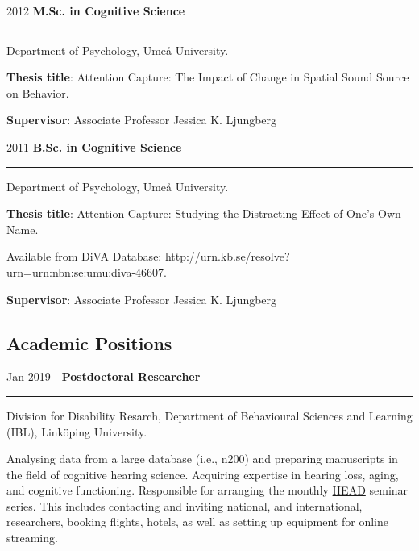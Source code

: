 \documentclass[]{article}
\begin{document}
2012 \hspace{1.5cm}\textbf{M.Sc. in Cognitive Science}\vspace{1mm}

\hrule
\begin{changemargin}{2.3cm}{2.4cm}

Department of Psychology, Umeå University.

\textbf{Thesis title}: Attention Capture: The Impact of Change in Spatial Sound Source on Behavior. 
    
\textbf{Supervisor}: Associate Professor Jessica K. Ljungberg
\end{changemargin}

2011 \hspace{1.5cm}\textbf{B.Sc. in Cognitive Science}\vspace{1mm}

\hrule

\begin{changemargin}{2.3cm}{2.4cm}

Department of Psychology, Umeå University.

\textbf{Thesis title}:  Attention Capture: Studying the Distracting Effect of One’s Own Name.

Available from DiVA Database: \sloppy http://urn.kb.se/resolve?urn=urn:nbn:se:umu:diva-46607.
    
\textbf{Supervisor}: Associate Professor Jessica K. Ljungberg
\end{changemargin}

\hypertarget{academic-positions}{%
\subsection{Academic Positions}\label{academic-positions}}

Jan 2019 - \hspace{0.50cm}\textbf{Postdoctoral Researcher}\vspace{1mm}

\hrule
\begin{changemargin}{2.3cm}{2.4cm}

Division for Disability Resarch, Department of Behavioural Sciences and Learning (IBL), Linköping University.

Analysing data from a large database (i.e., n200) and preparing manuscripts in the field of cognitive hearing science. Acquiring expertise in hearing loss, aging, and cognitive functioning. Responsible for arranging the monthly \href{https://liu.se/linnecentrum-head/en}{HEAD} seminar series. This includes contacting and inviting national, and international, researchers, booking flights, hotels, as well as setting up equipment for online streaming.

\end{changemargin}
\end{document}
